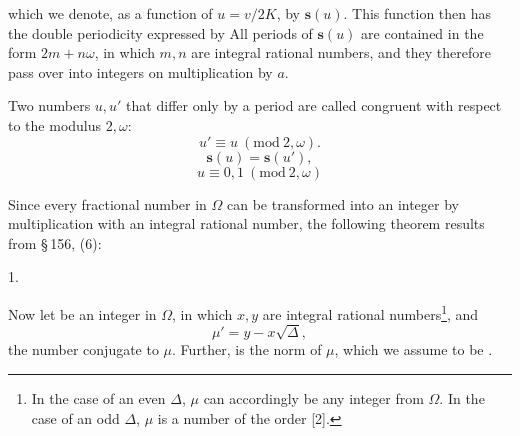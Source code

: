 
which we denote, as a function of $u = v/2K$, by $\boldsymbol{s}(u)$. This function then has the double periodicity expressed by
All periods of $\boldsymbol{s}(u)$ are contained in the form $2m + n\omega$, in which $m, n$ are integral rational numbers, and they therefore pass over into integers on multiplication by $a$.

Two numbers $u, u'$ that differ only by a period are called congruent with respect to the modulus $2, \omega$:
\[
u' \equiv u \ (\mathrm{mod}\ 2, \omega).
\]
\[
\boldsymbol{s}(u) = \boldsymbol{s}(u'),
\]
\[
u \equiv 0, 1 \ (\mathrm{mod}\ 2, \omega)
\]

Since every fractional number in $\Omega$ can be transformed into an integer by multiplication with an integral rational number, the following theorem results from \S\,156, (6):

1. 

Now let
be an integer in $\Omega$, in which $x, y$ are integral rational numbers\footnote{In the case of an even $\varDelta$, $\mu$ can accordingly be any integer from $\Omega$. In the case of an odd $\varDelta$, $\mu$ is a number of the order [2].}, and
\[
\mu' = y - x\sqrt{\varDelta},
\]
the number conjugate to $\mu$. Further,
is the norm of $\mu$, which we assume to be .
